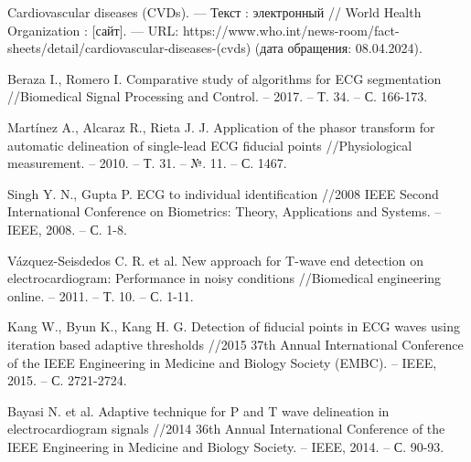 \begin{thebibliography}{00}
	Cardiovascular diseases (CVDs). --- Текст : электронный // World Health
	Organization : [сайт]. --- URL:
	https://www.who.int/news-room/fact-sheets/detail/cardiovascular-diseases-(cvds)
	(дата обращения: 08.04.2024).

	Beraza I., Romero I. Comparative study of algorithms for ECG segmentation
	//Biomedical Signal Processing and Control. – 2017. – Т. 34. – С. 166-173.

	Martínez A., Alcaraz R., Rieta J. J. Application of the phasor transform
	for automatic delineation of single-lead ECG fiducial points
	//Physiological measurement. – 2010. – Т. 31. – №. 11. – С. 1467.

	Singh Y. N., Gupta P. ECG to individual identification //2008 IEEE Second
	International Conference on Biometrics: Theory, Applications and Systems. –
	IEEE, 2008. – С. 1-8.

	Vázquez-Seisdedos C. R. et al. New approach for T-wave end detection on
	electrocardiogram: Performance in noisy conditions //Biomedical engineering
	online. – 2011. – Т. 10. – С. 1-11.

	Kang W., Byun K., Kang H. G. Detection of fiducial points in ECG waves
	using iteration based adaptive thresholds //2015 37th Annual International
	Conference of the IEEE Engineering in Medicine and Biology Society (EMBC).
	– IEEE, 2015. – С. 2721-2724.

	Bayasi N. et al. Adaptive technique for P and T wave delineation in
	electrocardiogram signals //2014 36th Annual International Conference of
	the IEEE Engineering in Medicine and Biology Society. – IEEE, 2014. – С.
	90-93.

\end{thebibliography}
\endgroup
